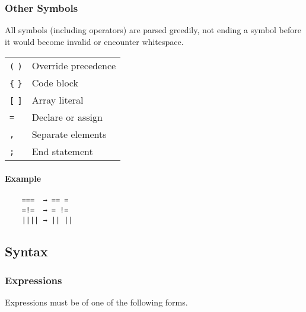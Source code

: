 \subsubsection{Other Symbols}

All symbols (including operators) are parsed greedily, not ending a symbol before it would become invalid or encounter whitespace.

\begin{table}[H]
    \begin{tabular}{ l l }
        \verb|(| \verb|)| & Override precedence \\
        \verb|{| \verb|}| & Code block          \\
        \verb|[| \verb|]| & Array literal       \\
        \verb|=|          & Declare or assign   \\
        \verb|,|          & Separate elements   \\
        \verb|;|          & End statement
    \end{tabular}
\end{table}

\paragraph{Example}

\begin{verbatim}
    ===  → == =
    =!=  → = !=
    |||| → || ||
\end{verbatim}

\subsection{Syntax}

\subsubsection{Expressions}

Expressions must be of one of the following forms.


